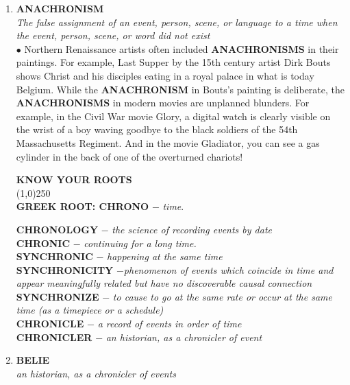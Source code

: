 \documentclass{book}
\begin{document}
\begin{enumerate}
\item \textbf{ANACHRONISM}\\ 
\textit{The false assignment of an event, person, scene, or language to a time when the event, person, scene, or word did not exist}\\

$\bullet$ Northern Renaissance artists often included \textbf{ANACHRONISMS} in their paintings. For example, Last Supper by the 15th century artist Dirk Bouts shows Christ and his disciples eating in a royal palace in what is today Belgium. While the \textbf{ANACHRONISM} in Bouts's painting is deliberate, the \textbf{ANACHRONISMS} in modern movies are unplanned blunders. For example, in the Civil War movie Glory, a digital watch is clearly visible on the wrist of a boy waving goodbye to the black soldiers of the 54th Massachusetts Regiment. And in the movie Gladiator, you can see a gas cylinder in the back of one of the overturned  chariots!

\begin{tcolorbox}
\begin{center}
\textbf{ KNOW YOUR ROOTS}\\
\line(1,0){250}\\
\textbf{GREEK ROOT: CHRONO } $ -$ \textit{time}.\\  
\end{center}  
\textbf{CHRONOLOGY} $-$ \textit{the science of recording events by date}\\ 
\textbf{CHRONIC} $-$ \textit{continuing for a long time.}\\ \textbf{SYNCHRONIC} $-$ \textit{happening at the same time}\\ 
\textbf{SYNCHRONICITY} $-$\textit{phenomenon of events which coincide in time and appear meaningfully related but have no discoverable causal connection}\\ \textbf{SYNCHRONIZE} $-$  \textit{to cause to go at the same rate or occur at the same time (as a timepiece or a schedule)}\\ 
\textbf{CHRONICLE} $-$  \textit{a record of events in order of time}\\ 
\textbf{CHRONICLER} $-$  \textit{an historian, as a chronicler of event}
\end{tcolorbox}

\item \textbf{BELIE}\\ \textit{an historian, as a chronicler of events}\\


\end{enumerate}
\end{document}
